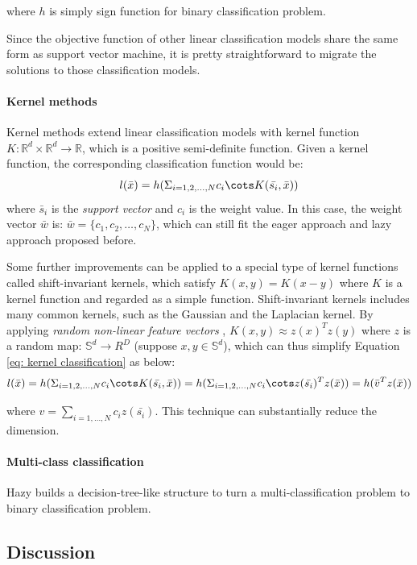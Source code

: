 where $h$ is simply sign function for binary classification problem.

Since the objective function of other linear classification models share the same form as support vector machine, it is pretty straightforward to migrate the solutions to those classification models.

\paragraph{Kernel methods}
Kernel methods extend linear classification models with kernel function $K: \mathbb{R}^d \times \mathbb{R}^d \rightarrow \mathbb{R}$, which is a positive semi-definite function. Given a kernel function, the corresponding classification function would be:
\begin{equation}\label{eq: kernel classification}
    l(\bar{x})=h(\Sigma_{i=1,2,\dots,N}c_i\cots K(\bar{s_i}, \bar{x}))
\end{equation}
where $\bar{s}_i$ is the {\em support vector} and $c_i$ is the weight value. In this case, the weight vector $\bar{w}$ is: $\bar{w} = \{c_1, c_2,\dots, c_N\}$, which can still fit the eager approach and lazy approach proposed before.

Some further improvements can be applied to a special type of kernel functions called shift-invariant kernels, which satisfy $K(x, y) = K(x-y)$ where $K$ is a kernel function and regarded as a simple function. Shift-invariant kernels includes many common kernels, such as the Gaussian and the Laplacian kernel. By applying {\em random non-linear feature vectors} \cite{rahimi2008random}, $K(x, y) \approx z(x)^Tz(y)$ where $z$ is a random map: $\mathbb{S}^d \rightarrow R^D$ (suppose $x, y \in \mathbb{S}^d$), which can thus simplify Equation \ref{eq: kernel classification} as below:
\begin{equation}
    l(\bar{x})=h(\Sigma_{i=1,2,\dots,N}c_i\cots K(\bar{s_i}, \bar{x})) = h(\Sigma_{i=1,2,\dots,N}c_i\cots z(\bar{s_i})^Tz(\bar{x}))=h(\bar{v}^Tz(\bar{x}))
\end{equation}

where $v=\sum_{i=1,\dots,N}c_iz(\bar{s_i})$. This technique can substantially reduce the dimension.

\paragraph{Multi-class classification}
Hazy builds a decision-tree-like structure to turn a multi-classification problem to binary classification problem.


\subsection{Discussion}
